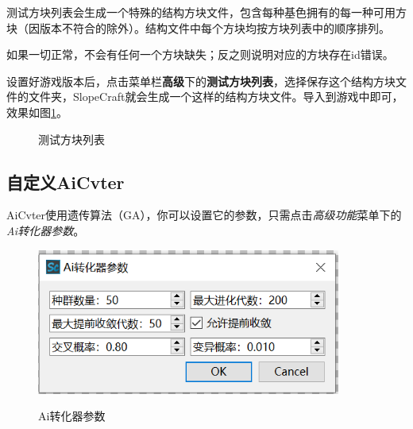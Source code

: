 \documentclass[UTF8]{ctexart}
\begin{document}
    测试方块列表会生成一个特殊的结构方块文件，包含每种基色拥有的每一种可用方块（因版本不符合的除外）。结构文件中每个方块均按方块列表中的顺序排列。
    
    如果一切正常，不会有任何一个方块缺失；反之则说明对应的方块存在id错误。

    设置好游戏版本后，点击菜单栏\textbf{高级}下的\textbf{测试方块列表}，选择保存这个结构方块文件的文件夹，SlopeCraft就会生成一个这样的结构方块文件。导入到游戏中即可，效果如图\ref*{testBlockListNBT}。

    \begin{figure}[htbp]
        \centering
        \caption{测试方块列表}
        \label{testBlockListNBT}
    \end{figure}

\subsection{自定义AiCvter}
\label{CustomizeAiCvter}
AiCvter使用遗传算法（GA），你可以设置它的参数，只需点击\textit{高级功能}菜单下的\textit{Ai转化器参数}。

\begin{figure}[htbp]
    \centering
    \includegraphics[width=10cm]{Img13_AiCvterParameters.png}
    \label{GAOpt}
    \caption{Ai转化器参数}
\end{figure}
\end{document}
